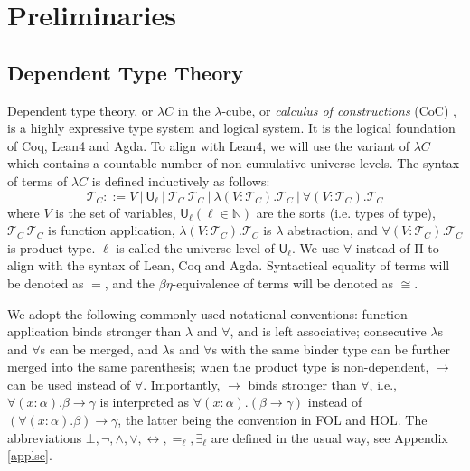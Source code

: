 \section{Preliminaries}

\subsection{Dependent Type Theory}\label{subdtt}

  Dependent type theory, or $\lambda C$ in the $\lambda$-cube,
  or \textit{calculus of constructions} (CoC) \cite{LambdaWithType},
  is a highly expressive type system and logical system. It is the logical
  foundation of Coq, Lean4 and Agda. To align with
  Lean4, we will use the variant of $\lambda C$ which contains a countable
  number of non-cumulative universe levels. The syntax of terms of $\lambda C$ is defined
  inductively as follows:
  $$\mathcal{T}_C ::= V \ | \ \mathsf{U}_\ell \ | \ \mathcal{T}_C \ \mathcal{T}_C \ |
    \ \lambda (V : \mathcal{T}_C). \mathcal{T}_C \ | \ \forall (V : \mathcal{T}_C). \mathcal{T}_C$$
  where $V$ is the set of variables, $\mathsf{U}_\ell (\ell \in \mathbb{N})$ are
  the sorts (i.e. types of type), $\mathcal{T}_C \ \mathcal{T}_C$ is function application,
  $\lambda (V : \mathcal{T}_C). \mathcal{T}_C$ is $\lambda$ abstraction, and
  $\forall (V : \mathcal{T}_C). \mathcal{T}_C$ is product type.
  $\ell$ is called the universe level of $\mathsf{U}_\ell$.
  We use $\forall$ instead of $\mathrm{\Pi}$ to align with the syntax of Lean, Coq and Agda.
  Syntactical equality of terms will be denoted as $=$, and the $\beta\eta$-equivalence of terms will be
  denoted as $\cong$.
  
  We adopt the following commonly used notational conventions:
  function application binds stronger than $\lambda$ and $\forall$, and is left associative;
  consecutive $\lambda$s and $\forall$s can be merged, and $\lambda$s and $\forall$s with the same
  binder type can be further merged into the same parenthesis; when the product type is non-dependent,
  $\to$ can be used instead of $\forall$. Importantly, $\to$ binds stronger than $\forall$, i.e.,
  $\forall (x : \alpha). \beta \to \gamma$ is interpreted as $\forall (x : \alpha). (\beta \to \gamma)$
  instead of $(\forall (x : \alpha). \beta) \to \gamma$, the latter being the convention in
  FOL and HOL. The abbreviations $\bot, \neg, \land, \lor, \leftrightarrow, =_\ell, \exists_\ell$
  are defined in the usual way, see Appendix \ref{applsc}.

